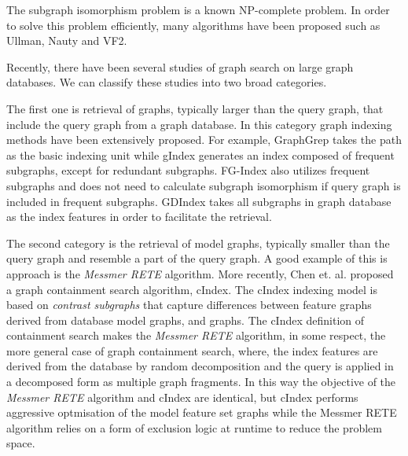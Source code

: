 The subgraph isomorphism problem is a known  NP-complete problem\cite{cook1971_np}.
In order to solve this problem efficiently, many algorithms have been proposed such as Ullman\cite{ullmann1976}, Nauty\cite{mckay1981} and VF2\cite{cordella2001_vf2}.

Recently, there have been several studies of graph search on large graph databases. We can classify these studies into two broad categories.

The first one is retrieval of graphs, typically larger than the query graph, that include the query graph from a graph database. 
In this category graph indexing methods have been extensively proposed. 
For example, GraphGrep\cite{shasha_wang_giugno2002_grapgrep} takes the path as the basic indexing unit while gIndex\cite{yan_yu_han2004_gindex} generates an index composed of frequent subgraphs, except for redundant subgraphs. 
FG-Index\cite{cheng2007_fgindex} also utilizes frequent subgraphs and does not need to calculate subgraph isomorphism if query graph is included in frequent subgraphs.
GDIndex\cite{williams_huan_wang2007_gdindex} takes all subgraphs in graph database as the index features in order to facilitate the retrieval.

The second category is the retrieval of model graphs, typically smaller than the query graph and resemble a part of the query graph. 
A good  example of this is approach is the \textit{Messmer RETE} algorithm\cite{messmer_bunke2000}. More recently, Chen et. al. proposed a graph containment search algorithm, cIndex\cite{chen2007_cindex}. 
The cIndex indexing model is based on  \textit{contrast subgraphs} that capture differences between feature graphs derived from database model graphs, and graphs. 
The cIndex definition of containment search makes the \textit{Messmer RETE} algorithm, in some respect, the more general case of graph containment search, where, the index features are derived from the database by random decomposition and the query is applied in a decomposed form as multiple graph fragments. 
In this way the objective of the \textit{Messmer RETE} algorithm and cIndex are identical, but cIndex performs aggressive optmisation of the model feature set graphs while the Messmer RETE algorithm relies on a form of  exclusion logic at runtime to reduce the problem space.
